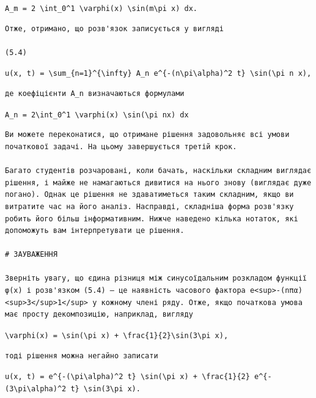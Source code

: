 \documentclass[
  ukrainian,
]{article}
\begin{document}
\texttt{A\_m\ =\ 2\ \textbackslash{}int\_0\^{}1\ \textbackslash{}varphi(x)\ \textbackslash{}sin(m\textbackslash{}pi\ x)\ dx.}

\begin{verbatim}
Отже, отримано, що розв'язок записується у вигляді

(5.4)
\end{verbatim}

\texttt{u(x,\ t)\ =\ \textbackslash{}sum\_\{n=1\}\^{}\{\textbackslash{}infty\}\ A\_n\ e\^{}\{-(n\textbackslash{}pi\textbackslash{}alpha)\^{}2\ t\}\ \textbackslash{}sin(\textbackslash{}pi\ n\ x),}

\begin{verbatim}
де коефіцієнти A_n визначаються формулами
\end{verbatim}

\texttt{A\_n\ =\ 2\textbackslash{}int\_0\^{}1\ \textbackslash{}varphi(x)\ \textbackslash{}sin(\textbackslash{}pi\ nx)\ dx}

\begin{verbatim}
Ви можете переконатися, що отримане рішення задовольняє всі умови початкової задачі. На цьому завершується третій крок.

Багато студентів розчаровані, коли бачать, наскільки складним виглядає рішення, і майже не намагаються дивитися на нього знову (виглядає дуже погано). Однак це рішення не здаватиметься таким складним, якщо ви витратите час на його аналіз. Насправді, складніша форма розв'язку робить його більш інформативним. Нижче наведено кілька нотаток, які допоможуть вам інтерпретувати це рішення.

# ЗАУВАЖЕННЯ

Зверніть увагу, що єдина різниця між синусоїдальним розкладом функції φ(x) і розв'язком (5.4) — це наявність часового фактора e<sup>-(nπα)<sup>3</sup>1</sup> у кожному члені ряду. Отже, якщо початкова умова має просту декомпозицію, наприклад, вигляду
\end{verbatim}

\texttt{\textbackslash{}varphi(x)\ =\ \textbackslash{}sin(\textbackslash{}pi\ x)\ +\ \textbackslash{}frac\{1\}\{2\}\textbackslash{}sin(3\textbackslash{}pi\ x),}

\begin{verbatim}
тоді рішення можна негайно записати
\end{verbatim}

\texttt{u(x,\ t)\ =\ e\^{}\{-(\textbackslash{}pi\textbackslash{}alpha)\^{}2\ t\}\ \textbackslash{}sin(\textbackslash{}pi\ x)\ +\ \textbackslash{}frac\{1\}\{2\}\ e\^{}\{-(3\textbackslash{}pi\textbackslash{}alpha)\^{}2\ t\}\ \textbackslash{}sin(3\textbackslash{}pi\ x).}
\end{document}
